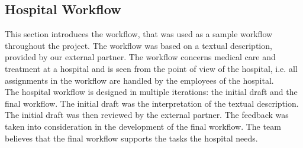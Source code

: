 \subsection{Hospital Workflow}
This section introduces the workflow, that was used as a sample workflow throughout the project. The workflow was based on a textual description, provided by our external partner. The workflow concerns medical care and treatment at a hospital and is seen from the point of view of the hospital, i.e. all assignments in the workflow are handled by the employees of the hospital. \\

The hospital workflow is designed in multiple iterations: the initial draft and the final workflow. The initial draft was the interpretation of the textual description. The initial draft was then reviewed by the external partner. The feedback was taken into consideration in the development of the final workflow. \newline
The team believes that the final workflow supports the tasks the hospital needs. 